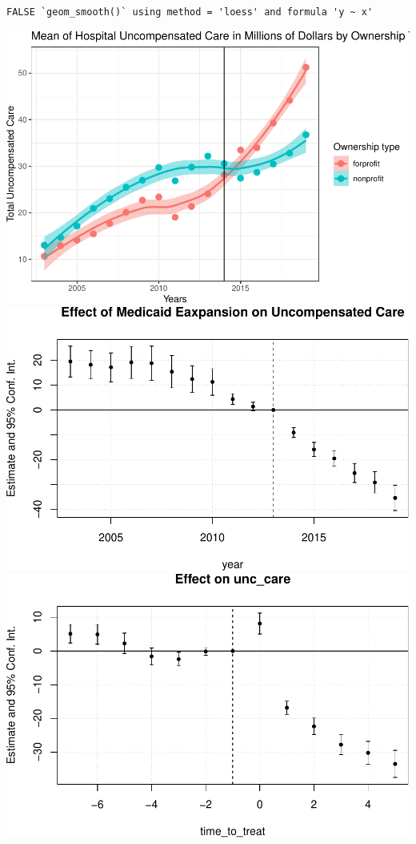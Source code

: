 \documentclass[
]{article}
\begin{document}
\begin{verbatim}
FALSE `geom_smooth()` using method = 'loess' and formula 'y ~ x'
\end{verbatim}

\includegraphics{Report_files/figure-latex/Figures-3.pdf}
\includegraphics{Report_files/figure-latex/Figures-4.pdf}
\includegraphics{Report_files/figure-latex/Figures-5.pdf}
\end{document}

